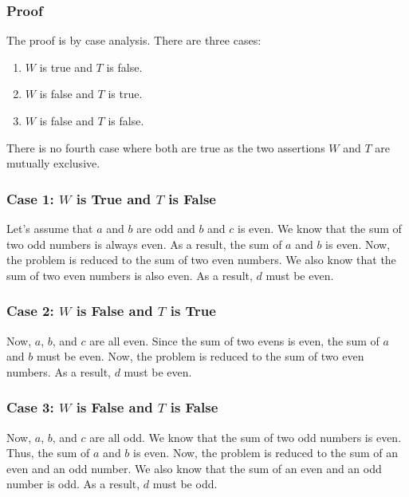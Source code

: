 \documentclass{article}
\begin{document}
\subsubsection*{Proof}

The proof is by case analysis. There are three cases:

\begin{enumerate}[\hspace{1cm}1.]
  \item $W$ is true and $T$ is false.
  \item $W$ is false and $T$ is true.
  \item $W$ is false and $T$ is false.
\end{enumerate}

There is no fourth case where both are true as the two assertions $W$ and
$T$ are mutually exclusive.

\subsubsection*{Case 1: $W$ is True and $T$ is False}

Let's assume that $a$ and $b$ are odd and $b$ and $c$ is even. We know that
the sum of two odd numbers is always even. As a result, the sum of $a$ and $b$
is even. Now, the problem is reduced to the sum of two even numbers. We also
know that the sum of two even numbers is also even. As a result, $d$ must be
even.

\subsubsection*{Case 2: $W$ is False and $T$ is True}

Now, $a$, $b$, and $c$ are all even. Since the sum of two evens is even, the sum
of $a$ and $b$ must be even. Now, the problem is reduced to the sum of two even
numbers. As a result, $d$ must be even.

\subsubsection*{Case 3: $W$ is False and $T$ is False}

Now, $a$, $b$, and $c$ are all odd. We know that the sum of two odd numbers is
even. Thus, the sum of $a$ and $b$ is even. Now, the problem is reduced to the
sum of an even and an odd number. We also know that the sum of an even and an
odd number is odd. As a result, $d$ must be odd.

\bigbreak
\end{document}

